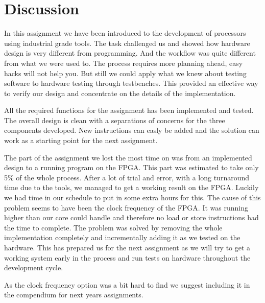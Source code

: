 \section{Discussion}

In this assignment we have been introduced to the development of processors using 
industrial grade tools. The task challenged us and showed how hardware design is
very different from programming. And the workflow was quite different from what we
were used to. The process requires more planning ahead, easy hacks will not help you.
But still we could apply what we knew about testing software to hardware testing 
through testbenches. This provided an effective way to verify our design and concentrate
on the details of the implementation. 

All the required functions for the assignment has been implemented and tested. The
overall design is clean with a separations of concerns for the three components developed. 
New instructions can easly be added and the solution can work as a starting point for the
next assignment. 

The part of the assignment we lost the most time on was from an implemented design to a running
program on the FPGA. This part was estimated to take only 5\% of the whole process. 
After a lot of trial and error, with a long turnaround time due to the tools, we managed to get 
a working result on the FPGA. Luckily we had time in our schedule to put in some extra hours for this.
The cause of this problem seems to have been the clock frequency of the FPGA. It was running higher 
than our core could handle and therefore no load or store instructions had the time to complete. 
The problem was solved by removing the whole implementation completely and incrementally adding
it as we tested on the hardware. This has prepared us for the next assignment as we will try
to get a working system early in the process and run tests on hardware throughout the development
cycle. 

As the clock frequency option was a bit hard to find we suggest including it in the compendium
for next years assignments. 
